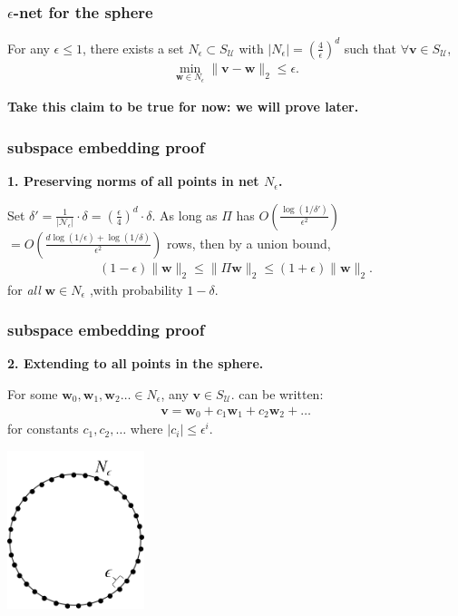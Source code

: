 \documentclass[compress]{beamer}
\newcommand{\bv}[1]{\mathbf{#1}}
\begin{document}
\begin{frame}[t]
	\frametitle{$\epsilon$-net for the sphere}
	\begin{lemma}
		For any $\epsilon \leq 1$, there exists a set $N_{\epsilon} \subset S_{\mathcal{U}}$ with $| N_\epsilon | = \left(\frac{4}{\epsilon}\right)^d$ such that $\forall \bv{v} \in S_{\mathcal{U}}$,
		\begin{align*}
			\min_{\bv{w} \in N_\epsilon} \|\bv{v} - \bv{w}\|_2 \leq \epsilon. 
		\end{align*}
	\end{lemma} 
\begin{center}
	\textbf{Take this claim to be true for now: we will prove later.}
\end{center}
\end{frame}

\begin{frame}[t]
	\frametitle{subspace embedding proof}
	\begin{center}
		\alert{\textbf{1. Preserving norms of all points in net $N_\epsilon$.}}
	\end{center}
	
	Set $\delta' = \frac{1}{|\mathcal{N}_{\epsilon}|}\cdot \delta =  \left(\frac{\epsilon}{4}\right)^d\cdot\delta$. As long as $\Pi$ has $O\left(\frac{\log(1/\delta')}{\epsilon^2}\right)$ $= O\left(\frac{d\log(1/\epsilon) + \log(1/\delta)}{\epsilon^2}\right)$ rows, then by a union bound,
	\begin{align*}
		(1-\epsilon)\|\bv{w}\|_2 \leq \|\Pi \bv{w}\|_2 \leq	(1+\epsilon)\|\bv{w}\|_2.
	\end{align*}
for \emph{all} $\bv{w} \in N_\epsilon$ ,with probability $1-\delta$.
\end{frame}

\begin{frame}[t]
	\frametitle{subspace embedding proof}
	\begin{center}
		\alert{\textbf{2. Extending to all points in the sphere.}}
	\end{center}
	For some $\bv{w}_0, \bv{w}_1, \bv{w}_2 \ldots \in N_\epsilon$, any $\bv{v} \in S_{\mathcal{U}}$.  can be written:
	\begin{align*}
		\bv{v} = \bv{w}_0 + c_1\bv{w}_1+ c_2\bv{w}_2 + \ldots
	\end{align*}
	for constants $c_1, c_2,\ldots$ where $|c_i| \leq \epsilon^i$. 
	
	\includegraphics[width=0.3\textwidth]{2dnet_plain.png}
\end{frame}
\end{document}

